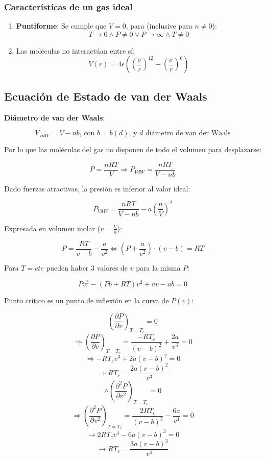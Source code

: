         \subsubsection{Características de un gas ideal}
        
        \begin{enumerate}
            \item \textbf{Puntiforme}: Se cumple que \(V=0\), para (inclusive para \(n \neq 0\)):
            \[T \rightarrow 0 \wedge P \neq 0 \vee P \rightarrow \infty \wedge T \neq 0\]
            \item Las moléculas no interactúan entre sí:
            \[V(r)=4 \epsilon \left ( \left ( \frac{\sigma}{r} \right )^{12}  - \left ( \frac{\sigma}{r} \right )^{6} \right)\]
        \end{enumerate}
        
    \subsection{Ecuación de Estado de van der Waals}
    
    \textbf{Diámetro de van der Waals}:
    
    \[V_{VdW}=V-nb\text{, con }b=b(d)\text{, y }d\text{ diámetro de van der Waals}\]
    
    Por lo que las moléculas del gas no disponen de todo el volumen para desplazarse:
    
    \[P=\frac{nRT}{V} \Rightarrow P_{VdW}=\frac{nRT}{V-nb}\]
    
    Dado fuerzas atractivas, la presión es inferior al valor ideal:
    
    \[P_{VdW}=\frac{nRT}{V-nb}-a\left ( \frac{n}{V} \right )^{2}\]
    
    Expresada en volumen molar (\(v=\frac{V}{n}\)):
    
    \begin{equation}
    \label{van_der_waals}
        P=\frac{RT}{v-b}-\frac{a}{v^{2}} \Leftrightarrow \left ( P + \frac{a}{v^{2}}\right )\cdot (v-b) = RT
    \end{equation}
    
    Para \(T=cte\) pueden haber 3 valores de \(v\) para la misma \(P\):
    
    \[Pv^{3}-(Pb+RT)v^{2} + av - ab = 0\]
    
    Punto crítico es un punto de inflexión en la curva de \(P(v)\):
    
    \[\left( \frac{\partial P}{\partial v} \right)_{T=T_{c}}=0\]
    \[\Rightarrow \left( \frac{\partial P}{\partial v} \right)_{T=T_{c}}=\frac{-RT_{c}}{(v-b)^{2}}+\frac{2a}{v^{3}}=0\]
    \[\Rightarrow -RT_{c}v^{3} + 2a(v-b)^{2}=0\]
    \[\Rightarrow RT_{c}=\frac{2a(v-b)^{2}}{v^{3}}\]
    \[\wedge \left( \frac{\partial^{2} P}{\partial v^{2}} \right)_{T=T_{c}}=0\]
    \[\Rightarrow \left( \frac{\partial^{2} P}{\partial v^{2}} \right)_{T=T_{c}}=\frac{2RT_{c}}{(v-b)^{3}}-\frac{6a}{v^{4}}=0\]
    \[\rightarrow 2RT_{c}v^{4}-6a(v-b)^{3}=0\]
    \[\rightarrow RT_{c}=\frac{3a(v-b)^{3}}{v^{4}}\]
    
